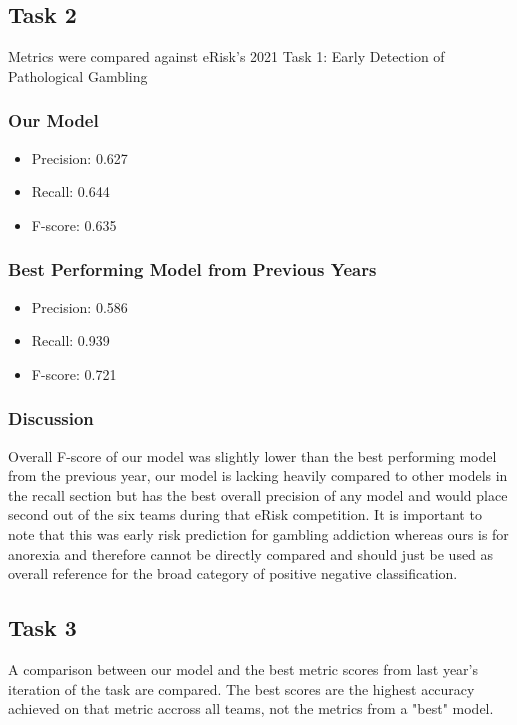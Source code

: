 \documentclass[12pt, titlepage]{article}
\begin{document}
\subsection{Task 2}
Metrics were compared against eRisk's 2021 Task 1: Early Detection of Pathological Gambling

\subsubsection{Our Model}
\begin{itemize}
    \item Precision: 0.627
    \item Recall: 0.644
    \item F-score: 0.635
\end{itemize}

\subsubsection{Best Performing Model from Previous Years}
\begin{itemize}
    \item Precision: 0.586
    \item Recall: 0.939
    \item F-score: 0.721
\end{itemize}

\subsubsection{Discussion}
Overall F-score of our model was slightly lower than the best performing model from the previous year, our model is lacking heavily compared to other models in the recall section but has the best overall precision of any model and would place second out of the six teams during that eRisk competition. It is important to note that this was early risk prediction for gambling addiction whereas ours is for anorexia and therefore cannot be directly compared and should just be used as overall reference for the broad category of positive negative classification.

\subsection{Task 3}
A comparison between our model and the best metric scores from last year's iteration of the task are compared. The best scores are the highest accuracy achieved on that metric accross all teams, not the metrics from a "best" model.
\end{document}
